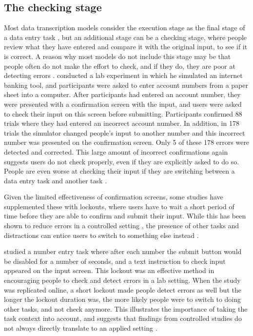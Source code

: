 \subsection{The checking stage}
Most data transcription models consider the execution stage as the final stage of a data entry task \citep{Card1983, Salthouse1986}, but an additional stage can be a checking stage, where people review what they have entered and compare it with the original input, to see if it is correct. A reason why most models do not include this stage may be that people often do not make the effort to check, and if they do, they are poor at detecting errors \citep{Olsen2008}. \citet{Olsen2008} conducted a lab experiment in which he simulated an internet banking tool, and participants were asked to enter account numbers from a paper sheet into a computer. After participants had entered an account number, they were presented with a confirmation screen with the input, and users were asked to check their input on this screen before submitting.  Participants confirmed 88 trials where they had entered an incorrect account number. In addition, in 178 trials the simulator changed people's input to another number and this incorrect number was presented on the confirmation screen. Only 5 of these 178 errors were detected and corrected. This large amount of incorrect confirmations again suggests users do not check properly, even if they are explicitly asked to do so. People are even worse at checking their input if they are switching between a data entry task and another task \citep{Wiseman2015}.

Given the limited effectiveness of confirmation screens, some studies have supplemented these with lockouts, where users have to wait a short period of time before they are able to confirm and submit their input. While this has been shown to reduce errors in a controlled setting \citep{Gould2016b}, the presence of other tasks and distractions can entice users to switch to something else instead \citep{Gould2016b, Katidioti2013}.

\citet{Gould2016b} studied a number entry task where after each number the submit button would be disabled for a number of seconds, and a text instruction to check input appeared on the input screen.  This lockout was an effective method in encouraging people to check and detect errors in a lab setting. When the study was replicated online, a short lockout made people detect errors as well but the longer the lockout duration was, the more likely people were to switch to doing other tasks, and not check anymore. This illustrates the importance of taking the task context into account, and suggests that findings from controlled studies do not always directly translate to an applied setting \citep{Gould2016b}. 

